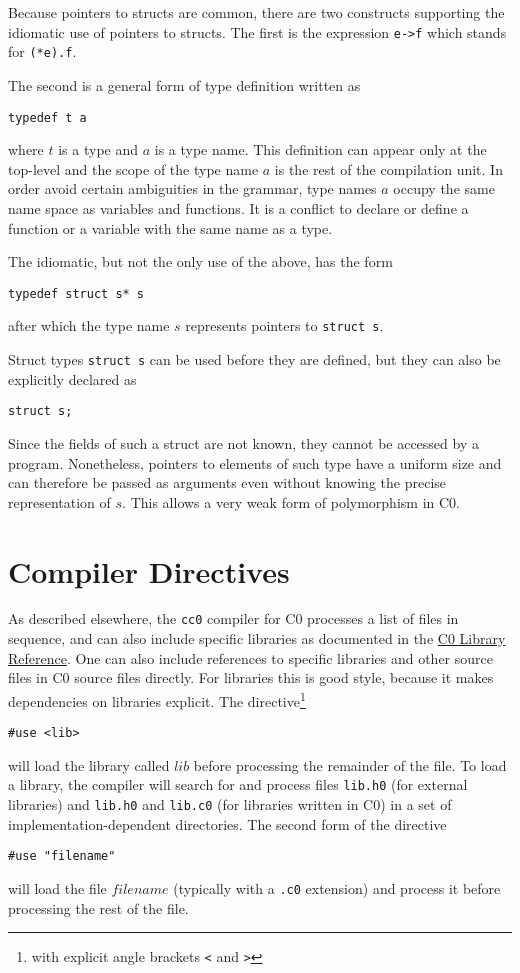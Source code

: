 \documentclass[11pt]{article}
\begin{document}
Because pointers to structs are common, there are two constructs
supporting the idiomatic use of pointers to structs.  The first
is the expression \lstinline'e->f' which stands for \lstinline'(*e).f'.

The second is a general form of type definition written as
\begin{lstlisting}
typedef t a
\end{lstlisting}
where $t$ is a type and $a$ is a type name.  This definition can
appear only at the top-level and the scope of the type name
$a$ is the rest of the compilation unit.  In order avoid certain
ambiguities in the grammar, type names $a$ occupy the same
name space as variables and functions.  It is a conflict to
declare or define a function or a variable with the same name
as a type.

The idiomatic, but not the only use of the above, has the form
\begin{lstlisting}
typedef struct s* s
\end{lstlisting}
after which the type name $s$ represents pointers
to \lstinline'struct s'.

Struct types \lstinline'struct s' can be used before they are defined,
but they can also be explicitly declared as
\begin{lstlisting}
struct s;
\end{lstlisting}
Since the fields of such a struct are not known, they cannot
be accessed by a program.  Nonetheless, pointers to elements
of such type have a uniform size and can therefore be passed
as arguments even without knowing the precise representation
of $s$.  This allows a very weak form of polymorphism in C0.

\section{Compiler Directives}

As described elsewhere, the \lstinline'cc0' compiler for C0 processes
a list of files in sequence, and can also include specific libraries
as documented in the
\href{http://c0.typesafety.net/doc/c0-libraries.pdf}{C0
  Library Reference}.  One can also include references to specific
libraries and other source files in C0 source files directly.  For
libraries this is good style, because it makes dependencies on
libraries explicit.  The directive\footnote{with explicit angle
  brackets \texttt{<} and \texttt{>}}
\begin{lstlisting}
#use <lib>
\end{lstlisting}
will load the library called $\mathit{lib}$ before processing the
remainder of the file.  To load a library, the compiler will search
for and process files \lstinline'lib.h0' (for external libraries) and
\lstinline'lib.h0' and \lstinline'lib.c0' (for libraries written in C0) in a set
of implementation-dependent directories.  The second form of the
directive
\begin{lstlisting}
#use "filename"
\end{lstlisting}
will load the file $\mathit{filename}$ (typically with a \lstinline'.c0'
extension) and process it before processing the rest of the file.
\end{document}
